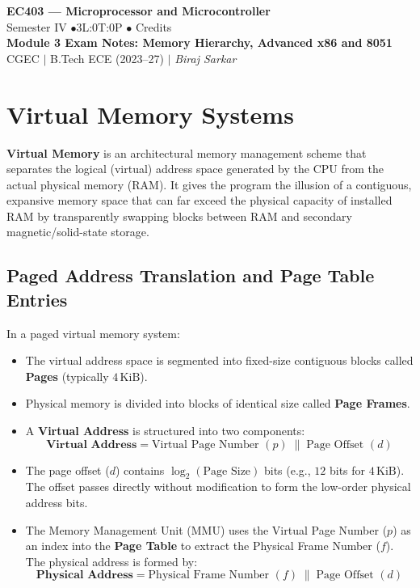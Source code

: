 \documentclass[12pt,a4paper]{article}
\begin{document}
\begin{center}
  {\LARGE\bfseries\color{myred} EC403 --- Microprocessor and Microcontroller}\\[5pt]
  {\normalsize\color{mydark} Semester IV \quad$\bullet$\quad 3L:0T:0P \quad$\bullet$ Credits}\\[3pt]
  {\normalsize\color{myteal}\textbf{Module 3 Exam Notes: Memory Hierarchy, Advanced x86 and 8051}}\\[3pt]
  {\small\color{mydark} CGEC \;$|$\; B.Tech ECE (2023--27) \;$|$\; \textit{Biraj Sarkar}}
\end{center}
\vspace{2pt}
\noindent{\color{myred}\rule{\linewidth}{1.5pt}}
\vspace{2pt}

\hypersetup{linkcolor=mydark}
\tableofcontents
\hypersetup{linkcolor=myteal}
\newpage

\section{Virtual Memory Systems}

\begin{tcolorbox}[defbox, title={Virtual Memory Principle}]
\textbf{Virtual Memory} is an architectural memory management scheme that separates the logical (virtual) address space generated by the CPU from the actual physical memory (RAM). It gives the program the illusion of a contiguous, expansive memory space that can far exceed the physical capacity of installed RAM by transparently swapping blocks between RAM and secondary magnetic/solid-state storage.
\end{tcolorbox}

\subsection{Paged Address Translation and Page Table Entries}
In a paged virtual memory system:
\begin{itemize}[leftmargin=*]
  \item The virtual address space is segmented into fixed-size contiguous blocks called \textbf{Pages} (typically $4\,\mathrm{KiB}$).
  \item Physical memory is divided into blocks of identical size called \textbf{Page Frames}.
  \item A \textbf{Virtual Address} is structured into two components:
  \[
  \mathbf{\text{Virtual Address}} = \text{Virtual Page Number } (p) \;\|\; \text{Page Offset } (d)
  \]
  \item The page offset ($d$) contains $\log_2(\text{Page Size})$ bits (e.g., $12$ bits for $4\,\mathrm{KiB}$). The offset passes directly without modification to form the low-order physical address bits.
  \item The Memory Management Unit (MMU) uses the Virtual Page Number ($p$) as an index into the \textbf{Page Table} to extract the Physical Frame Number ($f$). The physical address is formed by:
  \[
  \mathbf{\text{Physical Address}} = \text{Physical Frame Number } (f) \;\|\; \text{Page Offset } (d)
  \]
\end{itemize}
\end{document}
